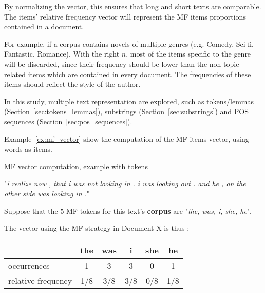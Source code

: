 By normalizing the vector, this ensures that long and short texts are comparable.
The items' relative frequency vector will represent the MF items proportions contained in a document.

For example, if a corpus contains novels of multiple genres (e.g. Comedy, Sci-fi, Fantastic, Romance).
With the right $n$, most of the items specific to the genre will be discarded, since their frequency should be lower than the non topic related items which are contained in every document.
The frequencies of these items should reflect the style of the author.

In this study, multiple text representation are explored, such as tokens/lemmas (Section~\ref{sec:tokens_lemmas}), substrings (Section~\ref{sec:substrings}) and POS sequences (Section~\ref{sec:pos_sequences}).

Example~\ref{ex:mf_vector} show the computation of the MF items vector, using words as items.

\begin{example}
  \centering
  \caption{MF vector computation, example with tokens}
  \label{ex:mf_vector}

  \begin{subexample}{\linewidth}
    "\textit{i realize now , that i was not looking in . i was looking out . and he , on the other side was looking in .}"\cite{ddlc}
  \end{subexample}

  \vspace{0.5cm}

  \begin{subexample}{\linewidth}
    Suppose that the $5$-MF tokens for this text's \textbf{corpus} are "\textit{the, was, i, she, he}".

    The vector using the MF strategy in Document X is thus :
    \vspace{0.2cm}

    \centering
    \begin{tabular}{l c c c c c}
      \toprule
                       & the & was & i   & she & he  \\
      \midrule
      occurrences         & 1   & 3   & 3   & 0   & 1   \\
      relative frequency & 1/8 & 3/8 & 3/8 & 0/8 & 1/8 \\
      \bottomrule
    \end{tabular}
  \end{subexample}
\end{example}

